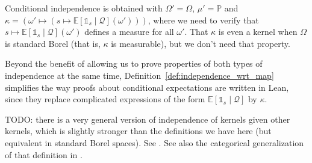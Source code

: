 Conditional independence is obtained with $\Omega' = \Omega$, $\mu' = \mathbb{P}$ and $\kappa = (\omega' \mapsto (s \mapsto \mathbb{E}[\mathbb{1}_{s} \mid \mathcal Q](\omega')))$, where we need to verify that $s \mapsto \mathbb{E}[\mathbb{1}_{s} \mid \mathcal Q](\omega')$ defines a measure for all $\omega'$. That $\kappa$ is even a kernel when $\Omega$ is standard Borel (that is, $\kappa$ is measurable), but we don't need that property.

Beyond the benefit of allowing us to prove properties of both types of independence at the same time, Definition~\ref{def:independence_wrt_map} simplifies the way proofs about conditional expectations are written in Lean, since they replace complicated expressions of the form $\mathbb{E}[\mathbb{1}_{s} \mid \mathcal Q]$ by $\kappa$.

TODO: there is a very general version of independence of kernels given other kernels, which is slightly stronger than the definitions we have here (but equivalent in standard Borel spaces). See \cite{forre2021transitional}.
See also the categorical generalization of that definition in \cite{fritz2023d}.
